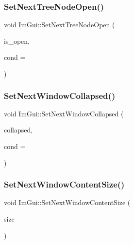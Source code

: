 \subsubsection{\texorpdfstring{Set\+Next\+Tree\+Node\+Open()}{SetNextTreeNodeOpen()}}
{\footnotesize\ttfamily void Im\+Gui\+::\+Set\+Next\+Tree\+Node\+Open (\begin{DoxyParamCaption}\item[{bool}]{is\+\_\+open,  }\item[{\mbox{\hyperlink{imgui_8h_aef890d6ac872e12c5804d0b3e4f7f103}{Im\+Gui\+Cond}}}]{cond = {} }\end{DoxyParamCaption})}

\mbox{\label{namespace_im_gui_a3e9380e253a3c49665a404e56950a52a}} 
\subsubsection{\texorpdfstring{Set\+Next\+Window\+Collapsed()}{SetNextWindowCollapsed()}}
{\footnotesize\ttfamily void Im\+Gui\+::\+Set\+Next\+Window\+Collapsed (\begin{DoxyParamCaption}\item[{bool}]{collapsed,  }\item[{\mbox{\hyperlink{imgui_8h_aef890d6ac872e12c5804d0b3e4f7f103}{Im\+Gui\+Cond}}}]{cond = {} }\end{DoxyParamCaption})}

\mbox{\label{namespace_im_gui_aae55a58c38d8e84b10eb1e8b1531372d}} 
\subsubsection{\texorpdfstring{Set\+Next\+Window\+Content\+Size()}{SetNextWindowContentSize()}}
{\footnotesize\ttfamily void Im\+Gui\+::\+Set\+Next\+Window\+Content\+Size (\begin{DoxyParamCaption}\item[{const \mbox{\hyperlink{struct_im_vec2}{Im\+Vec2}} \&}]{size }\end{DoxyParamCaption})}

